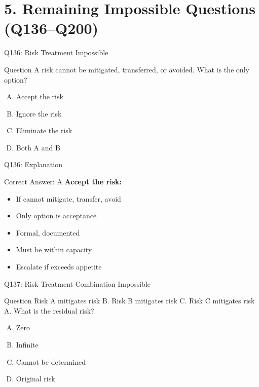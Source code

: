 \documentclass{beamer}
\begin{document}
	\section{5. Remaining Impossible Questions (Q136--Q200)}
	
	\begin{frame}{Q136: Risk Treatment Impossible}
		\begin{block}{Question}
			A risk cannot be mitigated, transferred, or avoided. What is the only option?
		\end{block}
		\begin{enumerate}[(A)]
			\item Accept the risk
			\item Ignore the risk
			\item Eliminate the risk
			\item Both A and B
		\end{enumerate}
	\end{frame}
	
	\begin{frame}{Q136: Explanation}
		\begin{block}{Correct Answer: A}
			\textbf{Accept the risk:}
			\begin{itemize}
				\item If cannot mitigate, transfer, avoid
				\item Only option is acceptance
				\item Formal, documented
				\item Must be within capacity
				\item Escalate if exceeds appetite
			\end{itemize}
		\end{block}
	\end{frame}
	
	\begin{frame}{Q137: Risk Treatment Combination Impossible}
		\begin{block}{Question}
			Risk A mitigates risk B. Risk B mitigates risk C. Risk C mitigates risk A. What is the residual risk?
		\end{block}
		\begin{enumerate}[(A)]
			\item Zero
			\item Infinite
			\item Cannot be determined
			\item Original risk
		\end{enumerate}
	\end{frame}
	
\end{document}

